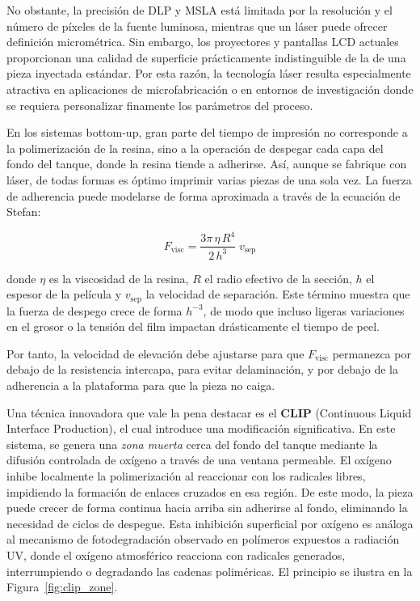 No obstante, la precisión de DLP y MSLA está limitada por la resolución y el número de píxeles de la fuente luminosa, mientras que un láser puede ofrecer definición micrométrica. Sin embargo, los proyectores y pantallas LCD actuales proporcionan una calidad de superficie prácticamente indistinguible de la de una pieza inyectada estándar. Por esta razón, la tecnología láser resulta especialmente atractiva en aplicaciones de microfabricación o en entornos de investigación donde se requiera personalizar finamente los parámetros del proceso.

En los sistemas bottom-up, gran parte del tiempo de impresión no corresponde a la polimerización de la resina, sino a la operación de despegar cada capa del fondo del tanque, donde la resina tiende a adherirse. Así, aunque se fabrique con láser, de todas formas es óptimo imprimir varias piezas de una sola vez. La fuerza de adherencia puede modelarse de forma aproximada a través de la ecuación de Stefan:

\begin{equation} 
F_{\mathrm{visc}} 	= \frac{3\pi\,\eta\,R^4}{2\,h^3}\;v_{\mathrm{sep}} 
\end{equation}

donde $\eta$ es la viscosidad de la resina, $R$ el radio efectivo de la sección, $h$ el espesor de la película y $v_{\mathrm{sep}}$ la velocidad de separación. Este término muestra que la fuerza de despego crece de forma $h^{-3}$, de modo que incluso ligeras variaciones en el grosor o la tensión del film impactan drásticamente el tiempo de peel.

Por tanto, la velocidad de elevación debe ajustarse para que $F_{\mathrm{visc}}$ permanezca por debajo de la resistencia intercapa, para evitar delaminación, y por debajo de la adherencia a la plataforma para que la pieza no caiga.

Una técnica innovadora que vale la pena destacar es el \textbf{CLIP} (Continuous Liquid Interface Production), el cual introduce una modificación significativa. En este sistema, se genera una \textit{zona muerta} cerca del fondo del tanque mediante la difusión controlada de oxígeno a través de una ventana permeable. El oxígeno inhibe localmente la polimerización al reaccionar con los radicales libres, impidiendo la formación de enlaces cruzados en esa región. De este modo, la pieza puede crecer de forma continua hacia arriba sin adherirse al fondo, eliminando la necesidad de ciclos de despegue. Esta inhibición superficial por oxígeno es análoga al mecanismo de fotodegradación observado en polímeros expuestos a radiación UV, donde el oxígeno atmosférico reacciona con radicales generados, interrumpiendo o degradando las cadenas poliméricas. El principio se ilustra en la Figura~\ref{fig:clip_zone}.

